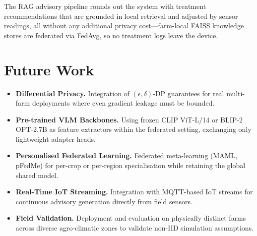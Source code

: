 \documentclass[12pt, a4paper, oneside]{Thesis}
\begin{document}
The RAG advisory pipeline rounds out the system with treatment recommendations that are grounded in local retrieval and adjusted by sensor readings, all without any additional privacy cost---farm-local FAISS knowledge stores are federated via FedAvg, so no treatment logs leave the device.

\section{Future Work}

\begin{itemize}[leftmargin=1.2em]
  \item \textbf{Differential Privacy.} Integration of $(\epsilon,\delta)$-DP guarantees for real multi-farm deployments where even gradient leakage must be bounded.
  \item \textbf{Pre-trained VLM Backbones.} Using frozen CLIP ViT-L/14 or BLIP-2 OPT-2.7B as feature extractors within the federated setting, exchanging only lightweight adapter heads.
  \item \textbf{Personalised Federated Learning.} Federated meta-learning (MAML, pFedMe) for per-crop or per-region specialisation while retaining the global shared model.
  \item \textbf{Real-Time IoT Streaming.} Integration with MQTT-based IoT streams for continuous advisory generation directly from field sensors.
  \item \textbf{Field Validation.} Deployment and evaluation on physically distinct farms across diverse agro-climatic zones to validate non-IID simulation assumptions.
\end{itemize}

\renewcommand{\bibname}{References}
\end{document}
